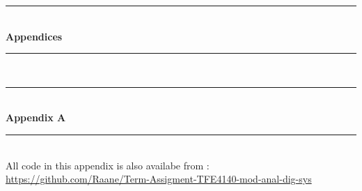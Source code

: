 \documentclass[a4paper]{IEEEtran}
\begin{document}
\clearpage
\begin{titlepage}
    \newcommand{\HRule}{\rule{\linewidth}{0.5mm}} %
    \center %
    \vspace*{3cm}
    \HRule \\[0.4cm]
    { \huge \bfseries Appendices}\\[0.4cm] %
    \HRule \\[1.5cm]
\end{titlepage}
\clearpage

\begin{titlepage}
    \newcommand{\HRule}{\rule{\linewidth}{0.5mm}} %
    \center %
    \vspace*{3cm}
    \HRule \\[0.4cm]
    { \huge \bfseries Appendix A}\\[0.4cm] %
    \HRule \\[1.5cm]
    All code in this appendix is also availabe from : \break \href{https://github.com/Raane/Term-Assigment-TFE4140-mod-anal-dig-sys}{https://github.com/Raane/Term-Assigment-TFE4140-mod-anal-dig-sys}


\end{titlepage}
\end{document}
